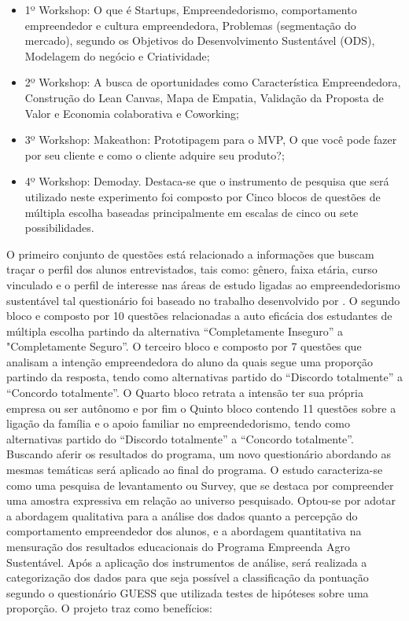 \begin{itemize}

\item {1º Workshop: O que é Startups, Empreendedorismo, comportamento empreendedor e cultura empreendedora, Problemas (segmentação do mercado), segundo os Objetivos do Desenvolvimento Sustentável (ODS), Modelagem do negócio e Criatividade;}
\item {2º Workshop: A busca de oportunidades como Característica Empreendedora, Construção do Lean Canvas, Mapa de Empatia, Validação da Proposta de Valor e Economia colaborativa e Coworking; }

\item {3º Workshop: Makeathon: Prototipagem para o MVP, O que você pode fazer por seu cliente e como o cliente adquire seu produto?;}
\item {4º Workshop: Demoday. Destaca-se que o instrumento de pesquisa que será utilizado neste experimento foi composto por Cinco blocos de questões de múltipla escolha baseadas principalmente em escalas de cinco ou sete possibilidades.}
\end{itemize}

O  primeiro conjunto de questões está relacionado a informações que buscam traçar o perfil dos alunos entrevistados, tais como: gênero, faixa etária, curso vinculado e o perfil de interesse nas áreas de estudo ligadas ao empreendedorismo sustentável tal questionário foi baseado no trabalho desenvolvido por . O segundo bloco e composto por 10 questões relacionadas a auto eficácia dos estudantes de múltipla escolha partindo da alternativa “Completamente Inseguro” a "Completamente Seguro”. O terceiro bloco e composto por 7 questões que analisam a intenção empreendedora do aluno da quais segue uma proporção partindo da resposta, tendo como alternativas partido do “Discordo totalmente” a “Concordo totalmente”. O Quarto bloco retrata a intensão ter sua própria empresa ou ser autônomo e por fim o Quinto bloco contendo 11 questões sobre a ligação da família e o apoio familiar no empreendedorismo, tendo como alternativas partido do “Discordo totalmente” a “Concordo totalmente”. Buscando aferir os resultados do programa, um novo questionário abordando as mesmas temáticas será aplicado ao final do programa. 
O estudo caracteriza-se como uma pesquisa de levantamento ou Survey, que se destaca por compreender uma amostra expressiva em relação ao universo pesquisado. Optou-se por adotar a abordagem qualitativa para a análise dos dados quanto a percepção do comportamento empreendedor dos alunos, e a abordagem quantitativa na mensuração dos resultados educacionais do Programa Empreenda Agro Sustentável. Após a aplicação dos instrumentos de análise, será realizada a categorização dos dados para que seja possível a classificação da pontuação segundo o questionário GUESS que utilizada testes de hipóteses sobre uma proporção. O projeto traz como benefícios: 

